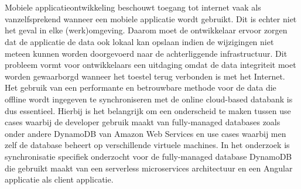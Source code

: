 



\chapter*{}

Mobiele applicatieontwikkeling beschouwt toegang tot internet vaak als vanzelfsprekend wanneer een mobiele applicatie wordt gebruikt. Dit is echter niet het geval in elke (werk)omgeving. Daarom moet de ontwikkelaar ervoor zorgen dat de applicatie de data ook lokaal kan opslaan indien de wijzigingen niet meteen kunnen worden doorgevoerd naar de achterliggende infrastructuur. Dit probleem vormt voor ontwikkelaars een uitdaging omdat de data integriteit moet worden gewaarborgd wanneer het toestel terug verbonden is met het Internet. Het gebruik van een performante en betrouwbare methode voor de data die offline wordt ingegeven te synchroniseren met de online cloud-based databank is dus essentieel. Hierbij is het belangrijk om een onderscheid te maken tussen use cases waarbij de developer gebruik maakt van fully-managed databases zoals onder andere DynamoDB van Amazon Web Services en use cases waarbij men zelf de database beheert op verschillende virtuele machines. In het onderzoek is synchronisatie specifiek onderzocht voor de fully-managed database DynamoDB die gebruikt maakt van een serverless microservices architectuur en een Angular applicatie als client applicatie. 

